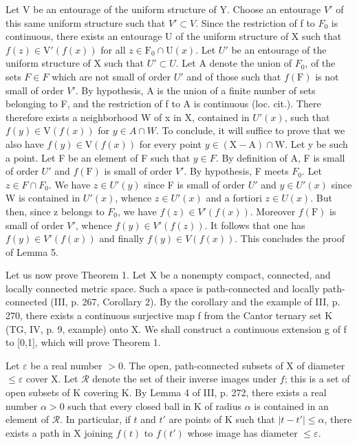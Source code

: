 Let V be an entourage of the uniform structure of Y. Choose an entourage \(V'\) of this same uniform structure such that \(V' \subset V\). Since the restriction of f to \(F_0\) is continuous, there exists an entourage U of the uniform structure of X such that \(f(z) \in \mathrm{V}'(f(x))\) for all \(z \in \mathrm{F}_0 \cap \mathrm{U}(x)\). Let \(U'\) be an entourage of the uniform structure of X such that \(U' \subset U\). Let A denote the union of \(F_0\), of the sets \(F \in F\) which are not small of order \(U'\) and of those such that \(f(\mathrm{F})\) is not small of order \(V'\). By hypothesis, A is the union of a finite number of sets belonging to F, and the restriction of f to A is continuous (loc. cit.). There therefore exists a neighborhood W of x in X, contained in \(U'(x)\), such that \(f(y) \in \mathrm{V}(f(x))\) for \(y \in A \cap W\). To conclude, it will suffice to prove that we also have \(f(y) \in \mathrm{V}(f(x))\) for every point \(y \in (\mathrm{X} - \mathrm{A}) \cap \mathrm{W}\). Let y be such a point. Let F be an element of F such that \(y \in F\). By definition of A, F is small of order \(U'\) and \(f(\mathrm{F})\) is small of order \(V'\). By hypothesis, F meets \(F_0\). Let \(z \in F \cap F_0\). We have \(z \in U'(y)\) since F is small of order \(U'\) and \(y \in U'(x)\) since W is contained in \(U'(x)\), whence \(z \in U'(x)\) and a fortiori \(z \in U(x)\). But then, since z belongs to \(F_0\), we have \(f(z) \in V'(f(x))\). Moreover \(f(\mathrm{F})\) is small of order \(V'\), whence \(f(y) \in V'(f(z))\). It follows that one has \(f(y) \in V'(f(x))\) and finally \(f(y) \in V(f(x))\). This concludes the proof of Lemma 5.

Let us now prove Theorem 1. Let X be a nonempty compact, connected, and locally connected metric space. Such a space is path-connected and locally path-connected (III, p. 267, Corollary 2). By the corollary and the example of III, p. 270, there exists a continuous surjective map f from the Cantor ternary set K (TG, IV, p. 9, example) onto X. We shall construct a continuous extension g of f to {[}0,1{]}, which will prove Theorem 1.

Let \(\varepsilon\) be a real number \(>0\). The open, path-connected subsets of X of diameter \(\leqslant \varepsilon\) cover X. Let \(\mathcal{R}\) denote the set of their inverse images under \(f\); this is a set of open subsets of K covering K. By Lemma 4 of III, p. 272, there exists a real number \(\alpha > 0\) such that every closed ball in K of radius \(\alpha\) is contained in an element of \(\mathcal{R}\). In particular, if \(t\) and \(t'\) are points of K such that \(|t - t'| \leqslant \alpha\), there exists a path in X joining \(f(t)\) to \(f(t')\) whose image has diameter \(\leqslant \varepsilon\).

